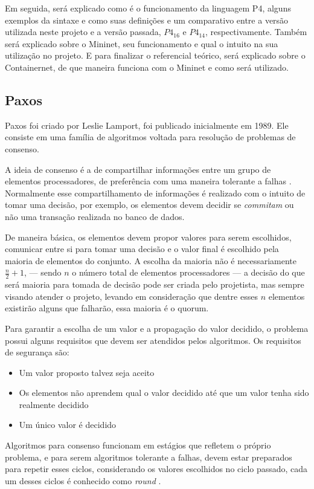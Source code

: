 \documentclass[12pt,
openright, 
oneside,
a4paper,
brazil]{facom-ufu-abntex2}
\theoremstyle{definition}
\begin{document}
Em seguida, será explicado como é o funcionamento da linguagem P4, alguns exemplos
da sintaxe e como suas definições e um comparativo entre a versão utilizada neste 
projeto e a versão passada, $P4_{16}$ e $P4_{14}$, respectivamente. 
Também será explicado sobre o Mininet, seu funcionamento e qual o intuito na sua 
utilização no projeto. E para finalizar o referencial teórico, será explicado sobre o
Containernet, de que maneira funciona com o Mininet e como será utilizado.

\subsection{Paxos}
Paxos foi criado por Leslie Lamport, foi publicado inicialmente em 1989. Ele consiste em uma 
família de algoritmos voltada para resolução de problemas de consenso. 

A ideia de consenso é a de compartilhar informações entre um grupo de elementos
processadores, de preferência com uma maneira tolerante a falhas \citep{barborak1993consensus}.
Normalmente esse compartilhamento de informações é realizado com o intuito de tomar
uma decisão, por exemplo, os elementos devem decidir se \textit{commitam} ou não
uma transação realizada no banco de dados. 

De maneira básica, os elementos devem propor valores para serem escolhidos, 
comunicar entre si para tomar uma decisão e o valor final é escolhido pela maioria de 
elementos do conjunto.
A escolha da maioria não é necessariamente $\frac{n}{2}+1$, --- sendo $n$ o número
total de elementos processadores --- a decisão do que será maioria para tomada de decisão
pode ser criada pelo projetista, mas sempre visando atender o projeto, levando
em consideração que dentre esses $n$ elementos existirão alguns que falharão, essa maioria
é o quorum.

Para garantir a escolha de um valor e a propagação do valor decidido, o problema
possui alguns requisitos que devem ser atendidos pelos algoritmos. Os requisitos de
segurança são:

\begin{itemize}
    \item Um valor proposto talvez seja aceito
    \item Os elementos não aprendem qual o valor decidido até que um valor 
    tenha sido realmente decidido
    \item Um único valor é decidido
\end{itemize}

Algoritmos para consenso funcionam em estágios que refletem o próprio problema, e para
serem algoritmos tolerante a falhas, devem estar preparados para repetir esses ciclos,
considerando os valores escolhidos no ciclo passado, cada um desses ciclos é conhecido como
\textit{round} \citep{camargos2008multicoordinated}.
\end{document}
